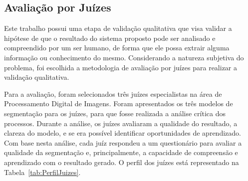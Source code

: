 \documentclass[12pt,oneside,a4paper,english,french,spanish,brazil,]{abntex2}
\begin{document}
\subsection{Avaliação por Juízes}

Este trabalho possui uma etapa de validação qualitativa que visa validar a hipótese de que o resultado do sistema proposto pode ser analisado e compreendido por um ser humano, de forma que ele possa extrair alguma informação ou conhecimento do mesmo. Considerando a natureza subjetiva do problema, foi escolhida a metodologia de avaliação por juízes para realizar a validação qualitativa.

Para a avaliação, foram selecionados três juízes especialistas na área de Processamento Digital de Imagens. Foram apresentados os três modelos de segmentação para os juízes, para que fosse realizada a análise crítica dos processos. Durante a análise, os juízes avaliaram a qualidade do resultado, a clareza do modelo, e se era possível identificar oportunidades de aprendizado. Com base nesta análise, cada juíz respondeu a um questionário para avaliar a qualidade da segmentação e, principalmente, a capacidade de compreensão e aprendizado com o resultado gerado. O perfil dos juízes está representado na Tabela~\ref{tab:PerfilJuizes}.
\end{document}
